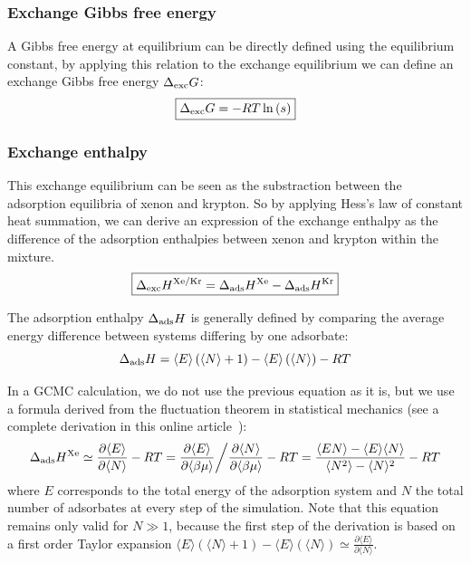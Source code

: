 \documentclass[main.tex]{subfiles}
\begin{document}
\subsubsection{Exchange Gibbs free energy}

A Gibbs free energy at equilibrium can be directly defined using the equilibrium constant, by applying this relation to the exchange equilibrium we can define an exchange Gibbs free energy $\Delta_{\text{exc}}G$:
\begin{equation}\label{eq:exc_gibbs_free_energy}
  \boxed{
  \Delta_{\text{exc}}G = -RT \ln\left(s\right)
  }
\end{equation}

\subsubsection{Exchange enthalpy}

This exchange equilibrium can be seen as the substraction between the adsorption equilibria of xenon and krypton. So by applying Hess's law of constant heat summation, we can derive an expression of the exchange enthalpy as the difference of the adsorption enthalpies between xenon and krypton within the mixture. 
\begin{equation}
  \boxed{
  \Delta_{\text{exc}}H^{\text{Xe/Kr}} = \Delta_{\text{ads}}H^{\text{Xe}} - \Delta_{\text{ads}}H^{\text{Kr}}
  }
\end{equation}

The adsorption enthalpy $\Delta_{\text{ads}}H$ is generally defined by comparing the average energy difference between systems differing by one adsorbate:
\begin{equation}\label{eq:enthalpy_gen_def}
  \Delta_{\text{ads}}H = \langle E \rangle\left(\langle N \rangle+1\right)-\langle E \rangle\left(\langle N \rangle\right) - RT
\end{equation}

In a GCMC calculation, we do not use the previous equation as it is, but we use a formula derived from the fluctuation theorem in statistical mechanics (see a complete derivation in this online article~\autocite{github_simon_gcmc}):
\begin{equation}\label{eq:ads_heat_gcmc}
  \Delta_{\text{ads}}H^{\text{Xe}} \simeq \frac{\partial \langle E \rangle}{\partial \langle N \rangle} - RT = \frac{\partial\langle E \rangle}{\partial\langle \beta\mu \rangle} \bigg/ \frac{\partial \langle N \rangle}{\partial \langle \beta\mu \rangle} - RT = \dfrac{\langle EN \rangle - \langle E \rangle\langle N \rangle}{\langle N^2 \rangle - \langle N \rangle^2} - RT
\end{equation}
where $E$ corresponds to the total energy of the adsorption system and $N$ the total number of adsorbates at every step of the simulation. Note that this equation remains only valid for $N\gg1$, because the first step of the derivation is based on a first order Taylor expansion $\langle E \rangle\left(\langle N \rangle+1\right)-\langle E \rangle\left(\langle N \rangle\right) \simeq \frac{\partial \langle E \rangle}{\partial \langle N \rangle}$. 
\end{document}
